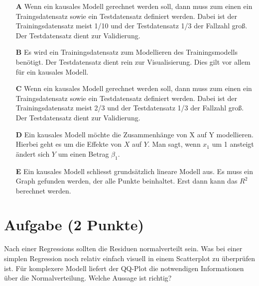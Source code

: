 \documentclass[a4paper, 9pt]{scrartcl}\usepackage[]{graphicx}\usepackage[]{xcolor}
\begin{document}
\begin{enumerate}
\item [\textbf{A} \msquare] Wenn ein kausales Modell gerechnet werden soll, dann muss zum einen ein Traingsdatensatz sowie ein Testdatensatz definiert werden. Dabei ist der Trainingsdatensatz meist 1/10 und der Testdatensatz 1/3 der Fallzahl groß. Der Testdatensatz dient zur Validierung.
\item [\textbf{B} \msquare] Es wird ein Trainingsdatensatz zum Modellieren des Trainingsmodells benötigt. Der Testdatensatz dient rein zur Visualisierung. Dies gilt vor allem für ein kausales Modell.
\item [\textbf{C} \msquare] Wenn ein kausales Modell gerechnet werden soll, dann muss zum einen ein Traingsdatensatz sowie ein Testdatensatz definiert werden. Dabei ist der Trainingsdatensatz meist 2/3 und der Testdatensatz 1/3 der Fallzahl groß. Der Testdatensatz dient zur Validierung.
\item [\textbf{D} \msquare] Ein kausales Modell möchte die Zusammenhänge von X auf Y modellieren. Hierbei geht es um die Effekte von $X$ auf $Y$. Man sagt, wenn $x_1$ um 1 ansteigt ändert sich $Y$ um einen Betrag $\beta_1$.
\item [\textbf{E} \msquare] Ein kausales Modell schliesst grundsätzlich lineare Modell aus. Es muss ein Graph gefunden werden, der alle Punkte beinhaltet. Erst dann kann das $R^2$ berechnet werden.
\end{enumerate}

\section{Aufgabe \hfill (2 Punkte)}



Nach einer Regressions sollten die Residuen normalverteilt sein. Was bei einer simplen Regression noch relativ einfach visuell in einem Scatterplot zu überprüfen ist. Für komplexere Modell liefert der QQ-Plot die notwendigen Informationen über die Normalverteilung. Welche Aussage ist richtig?
\end{document}
